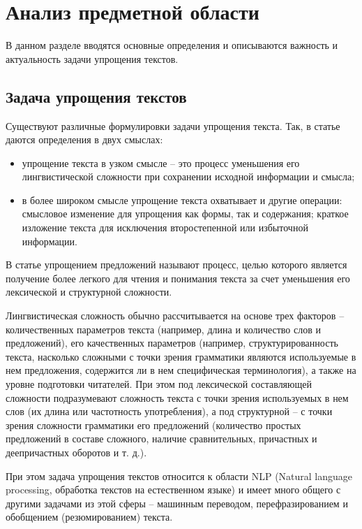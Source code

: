 \chapter{Анализ предметной области}

В данном разделе вводятся основные определения и описываются важность и актуальность задачи упрощения текстов.

\section{Задача упрощения текстов}


Существуют различные формулировки задачи упрощения текста. 
Так, в статье \cite{siddharthan_survey_2014} даются определения в двух смыслах:
\begin{itemize}
	\item упрощение текста в узком смысле -- это процесс уменьшения его лингвистической сложности при сохранении исходной информации и смысла;
	\item в более широком смысле упрощение текста охватывает и другие операции: смысловое изменение для упрощения как формы, так и содержания; краткое изложение текста для исключения второстепенной или избыточной информации.
\end{itemize}

В статье \cite{martin_muss_2021} упрощением предложений называют процесс, целью которого является получение более легкого для чтения и понимания текста за счет уменьшения его лексической и структурной сложности.


Лингвистическая сложность обычно рассчитывается на основе трех факторов -- количественных параметров текста (например, длина и количество слов и предложений), его качественных параметров (например, структурированность текста, насколько сложными с точки зрения грамматики являются используемые в нем предложения, содержится ли в нем специфическая терминология), а также на уровне подготовки читателей\cite{diff}. При этом под лексической составляющей сложности подразумевают сложность текста с точки зрения используемых в нем слов (их длина или частотность употребления), а под структурной -- с точки зрения сложности грамматики его предложений (количество простых предложений в составе сложного, наличие сравнительных, причастных и деепричастных оборотов и т. д.)\cite{2parts}.




При этом задача упрощения текстов относится к области NLP (Natural language processing, обработка текстов на естественном языке) и имеет много общего с другими задачами из этой сферы -- машинным переводом, перефразированием и обобщением (резюмированием) текста\cite{zhu_monolingual_2010}. 

